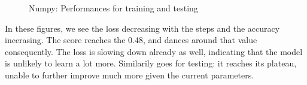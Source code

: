 \begin{figure}%
    \centering
    \qquad
    \caption{Numpy: Performances for training and testing}%
    \label{fig:defaults}%
\end{figure}

In these figures, we see the loss decreasing with the steps and the accuracy incerasing. The score reaches the 0.48, 
and dances around that value consequently. The loss is slowing down already as well, indicating that the
model is unlikely to learn a lot more. Similarily goes for testing: it reaches its plateau, unable to further improve much more given
the current parameters.